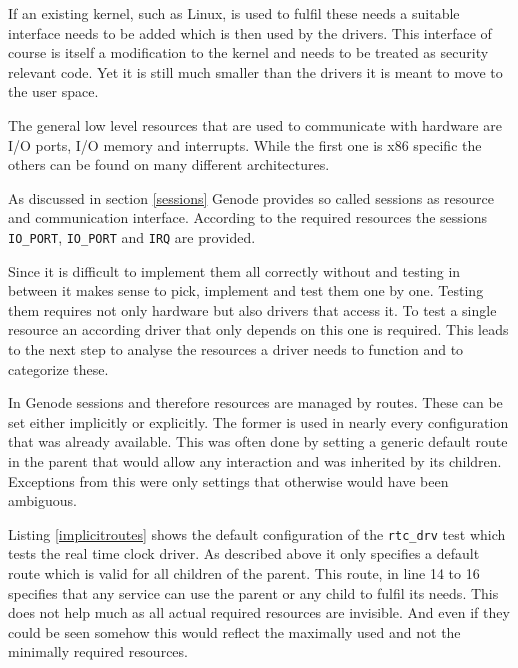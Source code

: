 \documentclass[
a4paper,
12pt,
notitlepage,
parskip=half,
DIV=11,
]{scrbook}
\begin{document}
		If an existing kernel, such as Linux, is used to fulfil these needs a suitable interface needs to be added which is then used by the drivers.
		This interface of course is itself a modification to the kernel and needs to be treated as security relevant code.
		Yet it is still much smaller than the drivers it is meant to move to the user space.
		
		The general low level resources that are used to communicate with hardware are I/O ports, I/O memory and interrupts.
		While the first one is x86 specific the others can be found on many different architectures.
		
		As discussed in section \ref{sessions} Genode provides so called sessions as resource and communication interface.
		According to the required resources the sessions \texttt{IO\_PORT}, \texttt{IO\_PORT} and \texttt{IRQ} are provided.
		
		Since it is difficult to implement them all correctly without and testing in between it makes sense to pick, implement and test them one by one.
		Testing them requires not only hardware but also drivers that access it.
		To test a single resource an according driver that only depends on this one is required.
		This leads to the next step to analyse the resources a driver needs to function and to categorize these.
		
		In Genode sessions and therefore resources are managed by routes.
		These can be set either implicitly or explicitly.
		The former is used in nearly every configuration that was already available.
		This was often done by setting a generic default route in the parent that would allow any interaction and was inherited by its children.
		Exceptions from this were only settings that otherwise would have been ambiguous.
		
		Listing \ref{implicitroutes} shows the default configuration of the \texttt{rtc\_drv} test which tests the real time clock driver.
		As described above it only specifies a default route which is valid for all children of the parent.
		This route, in line 14 to 16 specifies that any service can use the parent or any child to fulfil its needs.
		This does not help much as all actual required resources are invisible.
		And even if they could be seen somehow this would reflect the maximally used and not the minimally required resources.
		
\end{document}
